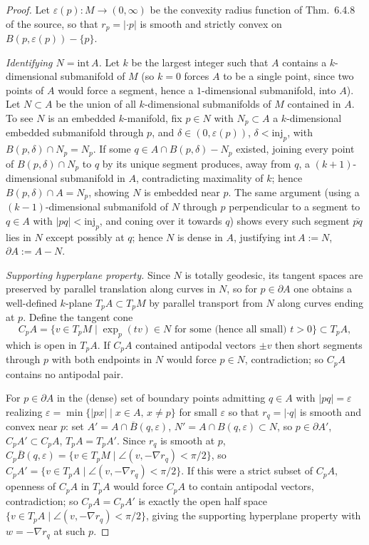 \begin{proof}
  Let $\varepsilon(p):M\to(0,\infty)$ be the convexity radius function of
  Thm.\ 6.4.8 of the source, so that $r_p=|{\cdot}p|$ is smooth and strictly
  convex on $B(p,\varepsilon(p))-\{p\}$.

  \emph{Identifying $N=\mathrm{int}\,A$.} Let $k$ be the largest integer such
  that $A$ contains a $k$-dimensional submanifold of $M$ (so $k=0$ forces $A$ to
  be a single point, since two points of $A$ would force a segment, hence a
  $1$-dimensional submanifold, into $A$). Let $N\subset A$ be the union of all
  $k$-dimensional submanifolds of $M$ contained in $A$. To see $N$ is an
  embedded $k$-manifold, fix $p\in N$ with $N_p\subset A$ a $k$-dimensional
  embedded submanifold through $p$, and $\delta\in(0,\varepsilon(p))$,
  $\delta<\mathrm{inj}_p$, with $B(p,\delta)\cap N_p=N_p$. If some
  $q\in A\cap B(p,\delta)-N_p$ existed, joining every point of
  $B(p,\delta)\cap N_p$ to $q$ by its unique segment produces, away from $q$, a
  $(k+1)$-dimensional submanifold in $A$, contradicting maximality of $k$; hence
  $B(p,\delta)\cap A=N_p$, showing $N$ is embedded near $p$. The same argument
  (using a $(k-1)$-dimensional submanifold of $N$ through $p$ perpendicular to a
  segment to $q\in A$ with $|pq|<\mathrm{inj}_p$, and coning over it towards
  $q$) shows every such segment $\overline{pq}$ lies in $N$ except possibly at
  $q$; hence $N$ is dense in $A$, justifying $\mathrm{int}\,A:=N$,
  $\partial A:=A-N$.

  \emph{Supporting hyperplane property.} Since $N$ is totally geodesic, its
  tangent spaces are preserved by parallel translation along curves in $N$, so
  for $p\in\partial A$ one obtains a well-defined $k$-plane $T_pA\subset T_pM$
  by parallel transport from $N$ along curves ending at $p$. Define the tangent
  cone
  \[
    C_pA=\{v\in T_pM\mid\exp_p(tv)\in N\text{ for some (hence all small) }t>0\}
    \subset T_pA,
  \]
  which is open in $T_pA$. If $C_pA$ contained antipodal vectors $\pm v$ then
  short segments through $p$ with both endpoints in $N$ would force $p\in N$,
  contradiction; so $C_pA$ contains no antipodal pair.

  For $p\in\partial A$ in the (dense) set of boundary points admitting
  $q\in A$ with $|pq|=\varepsilon$ realizing $\varepsilon=\min\{|px|\mid x\in
  A,\,x\ne p\}$ for small $\varepsilon$ so that $r_q=|{\cdot}q|$ is smooth and
  convex near $p$: set $A'=A\cap\overline B(q,\varepsilon)$,
  $N'=A\cap B(q,\varepsilon)\subset N$, so $p\in\partial A'$,
  $C_pA'\subset C_pA$, $T_pA=T_pA'$. Since $r_q$ is smooth at $p$,
  $C_p\overline B(q,\varepsilon)=\{v\in T_pM\mid\angle(v,-\nabla
  r_q)<\pi/2\}$, so
  $C_pA'=\{v\in T_pA\mid\angle(v,-\nabla r_q)<\pi/2\}$. If this were a strict
  subset of $C_pA$, openness of $C_pA$ in $T_pA$ would force $C_pA$ to contain
  antipodal vectors, contradiction; so $C_pA=C_pA'$ is exactly the open half
  space $\{v\in T_pA\mid\angle(v,-\nabla r_q)<\pi/2\}$, giving the supporting
  hyperplane property with $w=-\nabla r_q$ at such $p$.


\end{proof}
